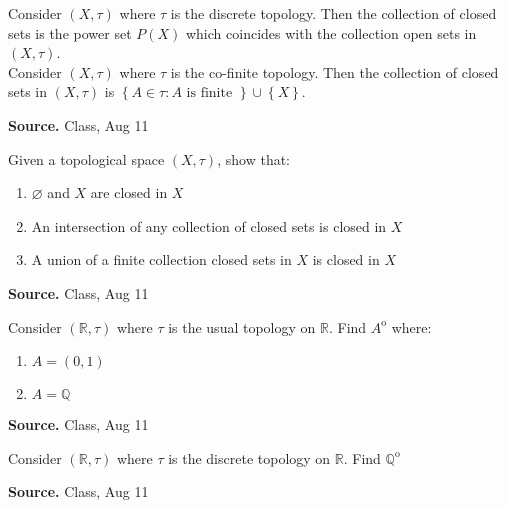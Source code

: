 \documentclass[12pt,twoside]{report}
\newenvironment*{source}{\hfill\scriptsize\textbf{Source.}\space}{\par}
\begin{document}
\begin{samepage}
\begin{ex}
Consider $\left (X, \tau\right )$ where $\tau$ is the discrete topology. Then the collection of closed sets is the power set $P\left (X\right )$ which coincides with the collection open sets in $\left (X, \tau\right )$.\\
Consider $\left (X, \tau\right )$ where $\tau$ is the co-finite topology. Then the collection of closed sets in $\left (X, \tau\right )$ is $ \left\{ A \in \tau  :  A \text{ is finite } \right\} \cup \left\{ X \right\} $.
\end{ex}
\begin{source}
Class, Aug 11
\end{source}
\end{samepage}

\begin{samepage}
\begin{ex}
 Given a topological space $\left (X, \tau\right )$, show that:
    \begin{enumerate}
        \item $\varnothing$ and $X$ are closed in $X$
        \item An intersection of any collection of closed sets is closed in $X$
        \item A union of a finite collection closed sets in $X$ is closed in $X$
    \end{enumerate}
\end{ex}
\begin{source}
Class, Aug 11
\end{source}
\end{samepage}

\begin{samepage}
\begin{ex}
Consider $\left (\mathbb{R}, \tau\right )$ where $\tau$ is the usual topology on $\mathbb{R}$.
Find $A^\mathrm{o}$ where:
    \begin{enumerate}
        \item $A = \left (0,1\right )$
        \item $A = \mathbb{Q}$
    \end{enumerate}
\end{ex}
\begin{source}
Class, Aug 11
\end{source}
\end{samepage}

\begin{samepage}
\begin{ex}
Consider $\left (\mathbb{R}, \tau\right )$ where $\tau$ is the discrete topology on $\mathbb{R}$.
Find $\mathbb{Q} ^\mathrm{o}$
\end{ex}
\begin{source}
Class, Aug 11
\end{source}
\end{samepage}
\end{document}
